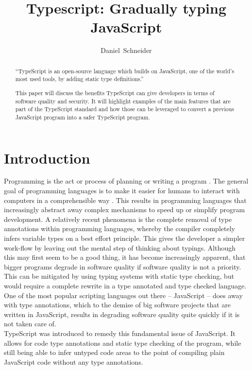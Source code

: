 \documentclass[english,runningheads, letterpaper]{llncs}[2018/03/10]
\begin{document}

\title{Typescript: Gradually typing JavaScript}
\author{Daniel~Schneider}
\maketitle
\begin{abstract}
``TypeScript is an open-source language which builds on JavaScript, one of the world’s most used tools, by adding static type definitions.''\cite{ref_ts_homepage}

This paper will discuss the benefits TypeScript can give developers
in terms of software quality and security. It will highlight examples
of the main features that are part of the TypeScript standard and
how those can be leveraged to convert a previous JavaScript program
into a safer TypeScript program.

\end{abstract}

\section{Introduction}

Programming is the act or process of planning or writing a program \cite{ref_programing_def}.
The general goal of programming languages is to make it easier for
humans to interact with computers in a comprehensible way \cite{ref_def_programing_language}. This results
in programming languages that increasingly abstract away complex mechanisms
to speed up or simplify program development. A relatively recent phenomena
is the complete removal of type annotations within programming languages,
whereby the compiler completely infers variable types on a best effort principle. This gives
the developer a simpler work-flow by leaving out the mental step of
thinking about typings. Although this may first seem to be a good
thing, it has become increasingly apparent, that bigger programs degrade
in software quality if software quality is not a priority. This can
be mitigated by using typing systems with static type checking, but
would require a complete rewrite in a type annotated and type checked
language. One of the most popular scripting languages out there --
JavaScript -- does away with type annotations, which to the demise
of big software projects that are written in JavaScript, results in degrading
software quality quite quickly if it is not taken care of. \\
TypeScript was introduced to remedy this fundamental issue of JavaScript.
It allows for code type annotations and static type checking of the
program, while still being able to infer untyped code
areas to the point of compiling plain JavaScript code without any
type annotations. 
\end{document}
